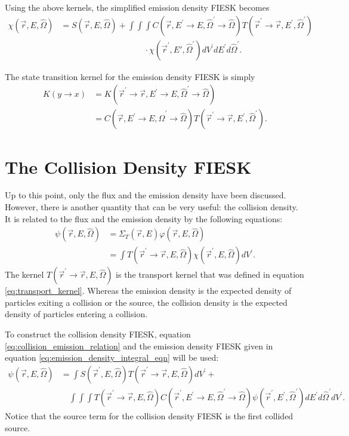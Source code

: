 Using the above kernels, the simplified emission density FIESK becomes
\begin{align}
\chi(\vec{r},E,\hat{\Omega}) & = S(\vec{r},E,\hat{\Omega}) +
    \int\int\int C(\vec{r},E^{'} \to E,\hat{\Omega}^{'} \to \hat{\Omega})
    T(\vec{r}^{'} \to \vec{r},E^{'},\hat{\Omega}^{'}) \nonumber \\
    & \qquad \qquad \qquad \qquad \qquad \cdot 
    \chi(\vec{r}^{'},E',\hat{\Omega}^{'}) dV^{'}dE^{'}d\hat{\Omega}^{'}.
    \label{eq:emission_density_integral_eqn}
\end{align}

The state transition kernel for the emission density FIESK is simply 
\begin{align}
  K(y \to x) & = K(\vec{r}^{'} \to \vec{r}, E^{'} \to E, 
  \hat{\Omega}^{'} \to \hat{\Omega}) \nonumber \\
  & = C(\vec{r},E^{'} \to E,\hat{\Omega}^{'} \to \hat{\Omega})
  T(\vec{r}^{'} \to \vec{r},E^{'},\hat{\Omega}^{'}).
\end{align}

\section{The Collision Density FIESK}
Up to this point, only the flux and the emission density have been discussed.
However, there is another quantity that can be very useful: the collision 
density. It is related to the flux and the emission density by the following 
equations:
\begin{align}
  \psi(\vec{r},E,\hat{\Omega}) & = \Sigma_T(\vec{r},E)
  \varphi(\vec{r},E,\hat{\Omega}) \\
  & = \int T(\vec{r}^{'} \to \vec{r},E,\hat{\Omega})
  \chi(\vec{r}^{'},E,\hat{\Omega})dV^{'}.
  \label{eq:collision_emission_relation}
\end{align}
The kernel $T(\vec{r}^{'} \to \vec{r},E,\hat{\Omega})$ is the transport kernel
that was defined in equation \ref{eq:transport_kernel}. Whereas the emission 
density is the expected density of particles exiting a collision or the source, 
the collision density is the expected density of particles entering a collision.

To construct the collision density FIESK, equation 
\ref{eq:collision_emission_relation} and the emission density FIESK given in
equation \ref{eq:emission_density_integral_eqn} will be used:
\begin{align}
  \psi(\vec{r},E,\hat{\Omega}) & = \int S(\vec{r}^{'},E,\hat{\Omega})
  T(\vec{r}^{'} \to \vec{r},E,\hat{\Omega}) dV^{'} + \nonumber \\
  & \quad \int\int\int
  T(\vec{r}^{'} \to \vec{r},E,\hat{\Omega})  
  C(\vec{r}^{'},E^{'} \to E,\hat{\Omega}^{'} \to \hat{\Omega}) 
  \psi(\vec{r}^{'},E^{'},\hat{\Omega}^{'}) dE^{'}d\hat{\Omega}^{'}dV^{'}.
  \label{eq:collision_density_integral_eqn}
\end{align}
Notice that the source term for the collision density FIESK is the first
collided source.

